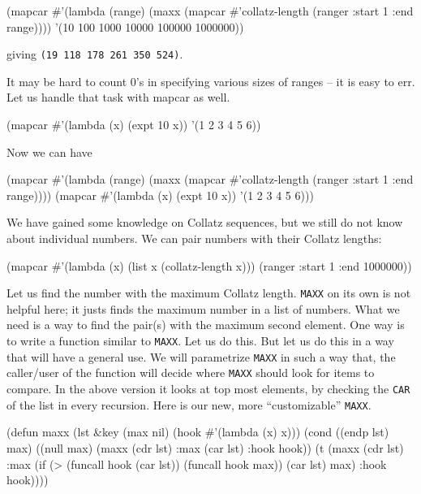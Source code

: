 \documentclass[a4paper,11pt]{article}
\begin{document}
\begin{uenum}
\begin{uenumi}
\begin{lispcode}
(mapcar 
	#'(lambda (range) 
		(maxx (mapcar #'collatz-length 
			(ranger :start 1 :end range)))) 
	'(10 100 1000 10000 100000 1000000))
\end{lispcode}
giving \Verb+(19 118 178 261 350 524)+.

\item It may be hard to count 0's in specifying various sizes of ranges -- it is easy to err. Let us handle that task with mapcar as well.

\begin{lispcode}
(mapcar #'(lambda (x) (expt 10 x)) '(1 2 3 4 5 6))
\end{lispcode}

Now we can have

\begin{lispcode}
(mapcar #'(lambda (range) 
			(maxx (mapcar #'collatz-length 
						  (ranger :start 1 :end range)))) 
		(mapcar #'(lambda (x) 
					(expt 10 x)) '(1 2 3 4 5 6)))
\end{lispcode}


\item We have gained some knowledge on Collatz sequences, but we still do not know about individual numbers. We can pair numbers with their Collatz lengths:

\begin{lispcode}
(mapcar #'(lambda (x) (list x (collatz-length x))) 
	(ranger :start 1 :end 1000000))
\end{lispcode}

\item Let us find the number with the maximum Collatz length. \Verb+MAXX+ on its own is not helpful here; it justs finds the maximum number in a list of numbers. What we need is a way to find the pair(s) with the maximum second element. One way is to write a function similar to \Verb+MAXX+. Let us do this. But let us do this in a way that will have a general use. We will parametrize \Verb+MAXX+ in such a way that, the caller/user of the function will decide where \Verb+MAXX+ should look for items to compare. In the above version it looks at top most elements, by checking the \Verb+CAR+ of the list in every recursion. Here is our new, more ``customizable'' \Verb+MAXX+.

\begin{lispcode}
(defun maxx (lst &key
                 (max nil)
                 (hook #'(lambda (x) x)))
  (cond ((endp lst) max)
        ((null max) (maxx (cdr lst)
                          :max (car lst)
                          :hook hook))
        (t (maxx
             (cdr lst)
             :max (if (> (funcall hook (car lst))
                         (funcall hook max))
                      (car lst)
                      max)
             :hook hook))))
\end{lispcode}


\end{uenumi}
\end{uenum}
\end{document}
